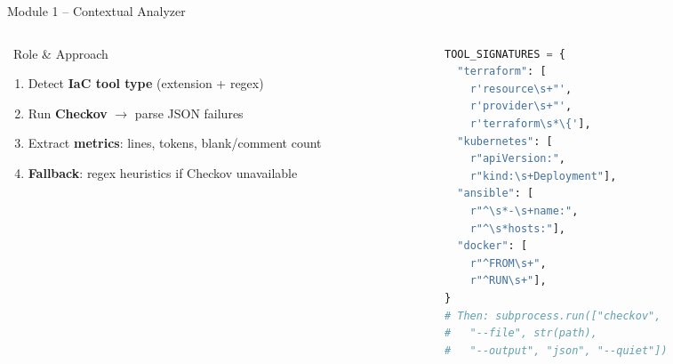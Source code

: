 \documentclass[aspectratio=169, 10pt]{beamer}
\begin{document}
\begin{frame}[fragile]{Module 1 -- Contextual Analyzer}
  \begin{columns}[T]
    \begin{column}{0.50\textwidth}
      \begin{block}{\faSearch\ Role \& Approach}
        \begin{enumerate}
          \item Detect \textbf{IaC tool type} (extension + regex)
          \item Run \textbf{Checkov} $\to$ parse JSON failures
          \item Extract \textbf{metrics}: lines, tokens, blank/comment count
          \item \textbf{Fallback}: regex heuristics if Checkov unavailable
        \end{enumerate}
      \end{block}
      \vspace{0.4em}
    \end{column}
    \begin{column}{0.46\textwidth}
\begin{lstlisting}[language=Python, caption=Tool detection logic]
TOOL_SIGNATURES = {
  "terraform": [
    r'resource\s+"',
    r'provider\s+"',
    r'terraform\s*\{'],
  "kubernetes": [
    r"apiVersion:",
    r"kind:\s+Deployment"],
  "ansible": [
    r"^\s*-\s+name:",
    r"^\s*hosts:"],
  "docker": [
    r"^FROM\s+",
    r"^RUN\s+"],
}
# Then: subprocess.run(["checkov",
#   "--file", str(path),
#   "--output", "json", "--quiet"])
\end{lstlisting}
    \end{column}
  \end{columns}
\end{frame}
\end{document}

